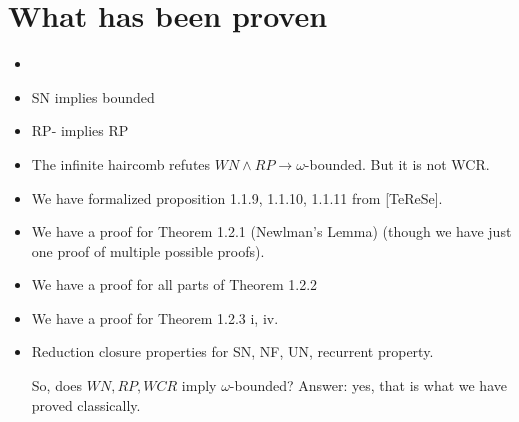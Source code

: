 \documentclass{scrartcl}
\begin{document}
\section{What has been proven}
\begin{itemize}
  \item {}
  \item SN implies bounded
  \item RP- implies RP
  \item The infinite haircomb refutes $WN \land RP \to \omega$-bounded.  But it is not WCR.
  \item We have formalized proposition 1.1.9, 1.1.10, 1.1.11 from [TeReSe]. 
  \item We have a proof for Theorem 1.2.1 (Newlman's Lemma) (though we have just one proof of multiple possible proofs).
  \item We have a proof for all parts of Theorem 1.2.2
  \item We have a proof for Theorem 1.2.3 i, iv. 
  \item Reduction closure properties for SN, NF, UN, recurrent property. 

  So, does $WN, RP, WCR$ imply $\omega$-bounded?
  Answer: yes, that is what we have proved classically.
\end{itemize}
  



\newpage
\end{document}
